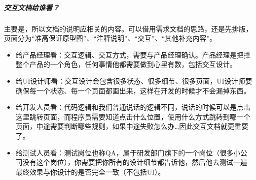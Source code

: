 \documentclass[letterpaper,10pt,english]{sphinxmanual}
\begin{document}
\subparagraph{交互文档给谁看？}
\label{\detokenize{chapter_knowledge/static_page:id6}}
主要是，所以文档的说明应相关的内容。可以借用需求文档的思路，还是先排版，页面分为“准高保证原型图”、“注释说明”、“交互”、“其他补充内容”。%
\begin{footnote}[610]\sphinxAtStartFootnote
{}
%
\end{footnote}
\begin{itemize}
\item {} 
给产品经理看：交互逻辑、交互方式，需要与产品经理确认。产品经理是把控整个产品的一个角色，任何事情他都需要做到心里有数，包括交互设计。

\item {} 
给UI设计师看：交互设计会包含很多状态、很多细节、很多页面，UI设计师要确保每一个状态、每一个页面都画出来，这样在开发的时候才不会漏掉东西。

\item {} 
给开发人员看：代码逻辑和我们普通说话的逻辑不同，说话的时候可以是点击这里跳转页面，而程序员需要知道点击什么位置，使用什么方式跳转到哪一个页面，中途需要判断哪些规则，如果中途失败怎么办…因此交互文档就更重要了。

\item {} 
给测试人员看：测试岗位也称QA，属于研发部门旗下的一个岗位（很多小公司没有这个岗位），你需要把你所有的设计细节都告诉他，然后他去测试一遍最终效果与你设计的是否完全一致（不包括UI）。

\end{itemize}
\end{document}
